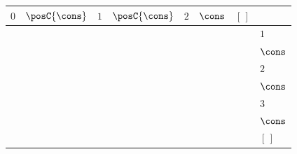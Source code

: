{\scriptsize\setlength{\tabcolsep}{1.5pt}%
\begin{tabular}{ccccccc|l}
$\text{0}$ & \cellcolor{blue!10}$\posC{\cons}$ & \cellcolor{blue!10}$\text{1}$ & \cellcolor{blue!10}$\posC{\cons}$ & $\text{2}$ & $\cons$ & $[\,]$ & \\ \hline
\gcell{$\posD{\bullet}$} & \gcell{$\posC{\circ}$} & \gcell{$$} & \gcell{$$} & \gcell{$$} & \gcell{$$} & \gcell{$$} & $\text{1}$ \\
\gcell{$$} & \gcell{$\posC{\circ}$} & \gcell{$$} & \gcell{$$} & \gcell{$$} & \gcell{$$} & \gcell{$$} & $\cons$ \\
\cellcolor{blue!10}\gcell{$$} & \cellcolor{blue!10}\gcell{$\posC{\circ}$} & \cellcolor{blue!10}\gcell{$\posD{\bullet}$} & \cellcolor{blue!10}\gcell{$\posC{\circ}$} & \cellcolor{blue!10}\gcell{$$} & \cellcolor{blue!10}\gcell{$$} & \cellcolor{blue!10}\gcell{$$} & \cellcolor{blue!10}$\text{2}$ \\
\gcell{$$} & \gcell{$\posC{\circ}$} & \gcell{$$} & \gcell{$\posC{\circ}$} & \gcell{$$} & \gcell{$$} & \gcell{$$} & $\cons$ \\
\gcell{$$} & \gcell{$\posC{\circ}$} & \gcell{$$} & \gcell{$\posC{\circ}$} & \gcell{$\posD{\bullet}$} & \gcell{$\posC{\circ}$} & \gcell{$$} & $\text{3}$ \\
\gcell{$$} & \gcell{$\posC{\circ}$} & \gcell{$$} & \gcell{$\posC{\circ}$} & \gcell{$$} & \gcell{$\posC{\circ}$} & \gcell{$$} & $\cons$ \\
\gcell{$$} & \gcell{$\posC{\circ}$} & \gcell{$$} & \gcell{$\posC{\circ}$} & \gcell{$$} & \gcell{$\posC{\circ}$} & \gcell{$\posC{\circ}$} & $[\,]$ \\
\end{tabular}}
